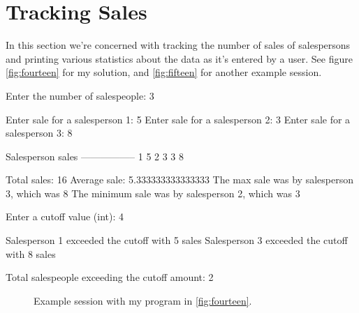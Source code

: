 \documentclass[leqno, 11pt]{article}
\begin{document}
\section*{Tracking Sales}
In this section we're concerned with tracking the number of sales of salespersons and printing various statistics about the data as it's entered by a user. See figure \autoref{fig:fourteen} for my solution, and \autoref{fig:fifteen} for another example session.
\begin{verbbox}[\mbox{}\scriptsize]
Enter the number of salespeople: 3

Enter sale for a salesperson 1: 5
Enter sale for a salesperson 2: 3
Enter sale for a salesperson 3: 8

Salesperson sales
-----------------
1    5
2    3
3    8

Total sales: 16
Average sale: 5.333333333333333
The max sale was by salesperson 3, which was 8
The minimum sale was by salesperson 2, which was 3

Enter a cutoff value (int): 4

Salesperson 1 exceeded the cutoff with 5 sales
Salesperson 3 exceeded the cutoff with 8 sales

Total salespeople exceeding the cutoff amount: 2
\end{verbbox}
\begin{figure}[h!]
  \centering
  \vspace{0.5cm}
  \theverbbox
  \caption{Example session with my program in \autoref{fig:fourteen}.}
  \label{fig:fifteen}
\end{figure}
\end{document}
